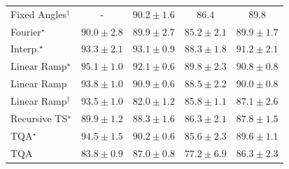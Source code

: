 \begin{tabular}{l|cccc|}
Fixed Angles$^\dagger$ & {\cellcolor[HTML]{000000}} \color[HTML]{F1F1F1} {\cellcolor{white}} \color{black} - & {\cellcolor[HTML]{096F3A}} \color[HTML]{F1F1F1} $90.2\pm 1.6$ & {\cellcolor[HTML]{218242}} \color[HTML]{F1F1F1} $86.4$ & {\cellcolor[HTML]{0C723B}} \color[HTML]{F1F1F1} $89.8$ \\
Fourier$^\star$ & {\cellcolor[HTML]{0B713B}} \color[HTML]{F1F1F1} $90.0\pm 2.8$ & {\cellcolor[HTML]{0B713B}} \color[HTML]{F1F1F1} $89.9\pm 2.7$ & {\cellcolor[HTML]{288A47}} \color[HTML]{F1F1F1} $85.2\pm 2.1$ & {\cellcolor[HTML]{0B713B}} \color[HTML]{F1F1F1} $89.9\pm 1.7$ \\
Interp.$^\star$ & {\cellcolor[HTML]{005E33}} \color[HTML]{F1F1F1} $93.3\pm 2.1$ & {\cellcolor[HTML]{005F34}} \color[HTML]{F1F1F1} $93.1\pm 0.9$ & {\cellcolor[HTML]{15793E}} \color[HTML]{F1F1F1} $88.3\pm 1.8$ & {\cellcolor[HTML]{036B38}} \color[HTML]{F1F1F1} $91.2\pm 2.1$ \\
Linear Ramp$^\star$ & {\cellcolor[HTML]{00532F}} \color[HTML]{F1F1F1} $95.1\pm 1.0$ & {\cellcolor[HTML]{006636}} \color[HTML]{F1F1F1} $92.1\pm 0.6$ & {\cellcolor[HTML]{0C723B}} \color[HTML]{F1F1F1} $89.8\pm 2.3$ & {\cellcolor[HTML]{066D39}} \color[HTML]{F1F1F1} $90.8\pm 0.8$ \\
Linear Ramp & {\cellcolor[HTML]{005B32}} \color[HTML]{F1F1F1} $93.8\pm 1.0$ & {\cellcolor[HTML]{056C39}} \color[HTML]{F1F1F1} $90.9\pm 0.6$ & {\cellcolor[HTML]{14783E}} \color[HTML]{F1F1F1} $88.5\pm 2.2$ & {\cellcolor[HTML]{0B713B}} \color[HTML]{F1F1F1} $90.0\pm 0.8$ \\
Linear Ramp$^\dagger$ & {\cellcolor[HTML]{005D33}} \color[HTML]{F1F1F1} $93.5\pm 1.0$ & {\cellcolor[HTML]{39A056}} \color[HTML]{F1F1F1} $82.0\pm 1.2$ & {\cellcolor[HTML]{248644}} \color[HTML]{F1F1F1} $85.8\pm 1.1$ & {\cellcolor[HTML]{1D7F41}} \color[HTML]{F1F1F1} $87.1\pm 2.6$ \\
Recursive TS$^\star$ & {\cellcolor[HTML]{0B713B}} \color[HTML]{F1F1F1} $89.9\pm 1.2$ & {\cellcolor[HTML]{15793E}} \color[HTML]{F1F1F1} $88.3\pm 1.6$ & {\cellcolor[HTML]{228343}} \color[HTML]{F1F1F1} $86.3\pm 2.1$ & {\cellcolor[HTML]{187B3F}} \color[HTML]{F1F1F1} $87.8\pm 1.5$ \\
TQA$^\star$ & {\cellcolor[HTML]{005730}} \color[HTML]{F1F1F1} $94.5\pm 1.5$ & {\cellcolor[HTML]{096F3A}} \color[HTML]{F1F1F1} $90.2\pm 0.6$ & {\cellcolor[HTML]{258745}} \color[HTML]{F1F1F1} $85.6\pm 2.3$ & {\cellcolor[HTML]{0D733C}} \color[HTML]{F1F1F1} $89.6\pm 1.1$ \\
TQA & {\cellcolor[HTML]{2F944E}} \color[HTML]{F1F1F1} $83.8\pm 0.9$ & {\cellcolor[HTML]{1E8041}} \color[HTML]{F1F1F1} $87.0\pm 0.8$ & {\cellcolor[HTML]{61BB6D}} \color[HTML]{F1F1F1} $77.2\pm 6.9$ & {\cellcolor[HTML]{228343}} \color[HTML]{F1F1F1} $86.3\pm 2.3$ \\

\end{tabular}
